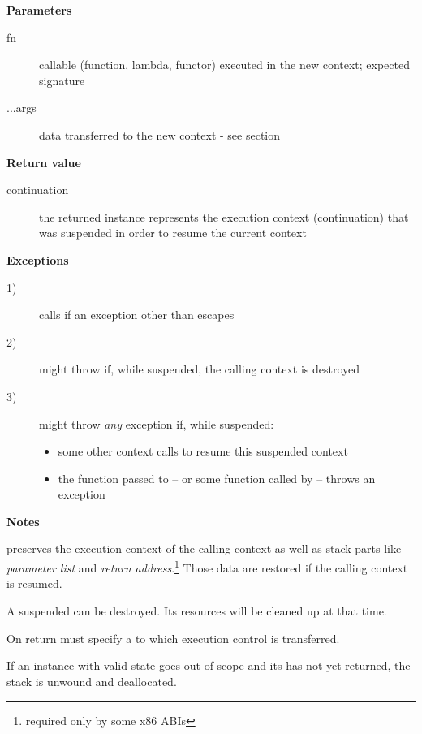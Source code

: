 {\bfseries Parameters}
\begin{description}
    \item[fn]      callable (function, lambda, functor) executed in the new
                   context; expected signature  
    \item[...args] data transferred to the new context - see section
                   \\
\end{description}

{\bfseries Return value}
\begin{description}
    \item[continuation] the returned instance represents the execution context
                        (continuation) that was suspended in order to
                        resume the current context
\end{description}

{\bfseries Exceptions}
\begin{description}
    \item[1)] calls  if an exception other
              than \unwindex escapes \entryfn\ 
    \item[2)] \callcc might throw \unwindex if,
              while suspended, the calling context is destroyed
    \item[3)] \callcc might throw \emph{any} exception if, while
              suspended:
        \begin{itemize}
            \item some other context calls \resumewith to resume
              this suspended context
            \item the function  passed to \resumewith --
              or some function called by  -- throws an exception
        \end{itemize}
\end{description}

{\bfseries Notes}
\begin{description}
\item \callcc preserves the execution context of the calling context as well as stack
parts like \emph{parameter list} and \emph{return address}.\footnote{required
only by some x86 ABIs} Those data are restored if the calling context is resumed.
\item A suspended  can be destroyed. Its resources will be cleaned
up at that time.
\item On return  must specify a \cont to which execution control is
transferred.
\item If an instance with valid state goes out of scope and its  has not yet
returned, the stack is unwound and deallocated.
\end{description}

